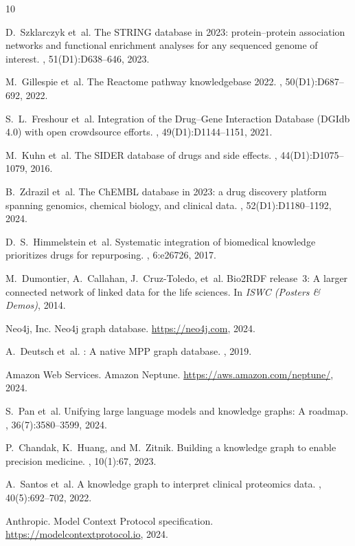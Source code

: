 \documentclass[sigconf, anonymous, review]{acmart}
\begin{document}

\begin{thebibliography}{10}

D.~Szklarczyk et~al.
\newblock The {STRING} database in 2023: protein--protein association networks
  and functional enrichment analyses for any sequenced genome of interest.
, 51(D1):D{638--646}, 2023.

M.~Gillespie et~al.
\newblock The {Reactome} pathway knowledgebase 2022.
, 50(D1):D{687--692}, 2022.

S.~L.~Freshour et~al.
\newblock Integration of the {Drug--Gene Interaction Database (DGIdb 4.0)}
  with open crowdsource efforts.
, 49(D1):D{1144--1151}, 2021.

M.~Kuhn et~al.
\newblock The {SIDER} database of drugs and side effects.
, 44(D1):D{1075--1079}, 2016.

B.~Zdrazil et~al.
\newblock The {ChEMBL} database in 2023: a drug discovery platform spanning
  genomics, chemical biology, and clinical data.
, 52(D1):D{1180--1192}, 2024.

D.~S.~Himmelstein et~al.
\newblock Systematic integration of biomedical knowledge prioritizes drugs for
  repurposing.
, 6:e26726, 2017.

M.~Dumontier, A.~Callahan, J.~Cruz-Toledo, et~al.
\newblock Bio2{RDF} release~3: A larger connected network of linked data
  for the life sciences.
\newblock In {\em ISWC (Posters \& Demos)}, 2014.

Neo4j, Inc.
\newblock Neo4j graph database. \url{https://neo4j.com}, 2024.

A.~Deutsch et~al.
: A native {MPP} graph database.
, 2019.

Amazon Web Services.
\newblock Amazon {Neptune}. \url{https://aws.amazon.com/neptune/}, 2024.

S.~Pan et~al.
\newblock Unifying large language models and knowledge graphs: A roadmap.
, 36(7):3580--3599, 2024.

P.~Chandak, K.~Huang, and M.~Zitnik.
\newblock Building a knowledge graph to enable precision medicine.
, 10(1):67, 2023.

A.~Santos et~al.
\newblock A knowledge graph to interpret clinical proteomics data.
, 40(5):692--702, 2022.

Anthropic.
\newblock Model {Context Protocol} specification.
\newblock \url{https://modelcontextprotocol.io}, 2024.

\end{thebibliography}
\end{document}
